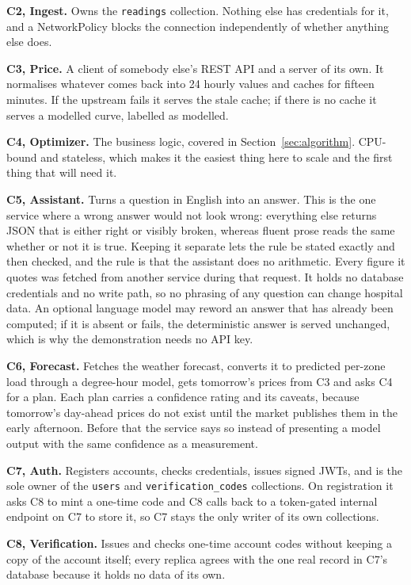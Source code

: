 \documentclass[conference]{IEEEtran}
\begin{document}
\textbf{C2, Ingest.} Owns the \texttt{readings} collection. Nothing else has
credentials for it, and a NetworkPolicy blocks the connection independently of
whether anything else does.

\textbf{C3, Price.} A client of somebody else's REST API and a server of its
own. It normalises whatever comes back into 24 hourly values and caches for
fifteen minutes. If the upstream fails it serves the stale cache; if there is no
cache it serves a modelled curve, labelled as modelled.

\textbf{C4, Optimizer.} The business logic, covered in
Section~\ref{sec:algorithm}. CPU-bound and stateless, which makes it the easiest
thing here to scale and the first thing that will need it.

\textbf{C5, Assistant.} Turns a question in English into an answer. This is the
one service where a wrong answer would not look wrong: everything else returns
JSON that is either right or visibly broken, whereas fluent prose reads the same
whether or not it is true. Keeping it separate lets the rule be stated exactly
and then checked, and the rule is that the assistant does no arithmetic. Every
figure it quotes was fetched from another service during that request. It holds
no database credentials and no write path, so no phrasing of any question can
change hospital data. An optional language model may reword an answer that has
already been computed; if it is absent or fails, the deterministic answer is
served unchanged, which is why the demonstration needs no API key.

\textbf{C6, Forecast.} Fetches the weather forecast, converts it to predicted
per-zone load through a degree-hour model, gets tomorrow's prices from C3 and
asks C4 for a plan. Each plan carries a confidence rating and its caveats,
because tomorrow's day-ahead prices do not exist until the market publishes them
in the early afternoon. Before that the service says so instead of presenting a
model output with the same confidence as a measurement.

\textbf{C7, Auth.} Registers accounts, checks credentials, issues signed JWTs,
and is the sole owner of the \texttt{users} and \texttt{verification\_codes}
collections. On registration it asks C8 to mint a one-time code and C8 calls
back to a token-gated internal endpoint on C7 to store it, so C7 stays the only
writer of its own collections.

\textbf{C8, Verification.} Issues and checks one-time account codes without
keeping a copy of the account itself; every replica agrees with the one real
record in C7's database because it holds no data of its own.
\end{document}
